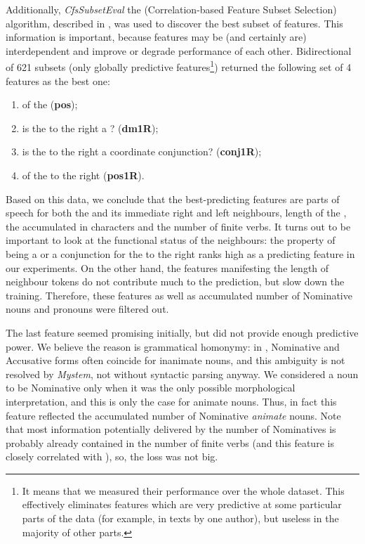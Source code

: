 \documentclass[output=paper]{langsci/langscibook.cls}
\begin{document}
Additionally, \textit{CfsSubsetEval} the (Correlation-based Feature Subset Selection) algorithm, described in \citet{Hall:1998}, was used to discover the best subset of features. This information is important, because features may be (and certainly are) interdependent and improve or degrade performance of each other. Bidirectional  of 621 subsets (only globally predictive features\footnote{It means that we measured their performance over the whole dataset. This effectively eliminates features which are very predictive at some particular parts of the data (for example, in texts by one author), but useless in the majority of other parts.}) returned the following set of 4 features as the best one:

\begin{enumerate}
\item {} of the  (\textbf{pos});
\item is the  to the right a ? (\textbf{dm1R});
\item is the  to the right a coordinate conjunction? (\textbf{conj1R});
\item {} of the  to the right (\textbf{pos1R}).
\end{enumerate}

Based on this data, we conclude that the best-predicting features are parts of speech for both the  and its immediate right and left neighbours, length of the , the accumulated  in characters and the number of finite verbs. It turns out to be important to look at the functional status of the neighbours: the property of being a  or a conjunction for the  to the right ranks high as a predicting feature in our experiments. On the other hand, the features manifesting the length of neighbour tokens do not contribute much to the prediction, but slow down the training. Therefore, these features as well as accumulated number of Nominative nouns and pronouns were filtered out. 

The last feature seemed promising initially, but did not provide enough predictive power. We believe the reason is grammatical homonymy: in , Nominative and Accusative forms often coincide for inanimate nouns, and this ambiguity is not resolved by \textit{Mystem}, not without syntactic parsing anyway. We considered a noun to be Nominative only when it was the only possible morphological interpretation, and this is only the case for animate nouns. Thus, in fact this feature reflected the accumulated number of Nominative \textit{animate} nouns. Note that most information potentially delivered by the number of Nominatives is probably already contained in the number of finite verbs (and this feature is closely correlated with ), so, the loss was not big.
\end{document}
